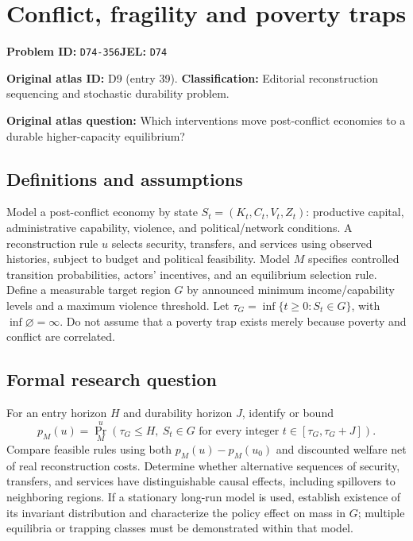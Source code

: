 \documentclass[11pt,a4paper]{article}
\begin{document}
\section*{Conflict, fragility and poverty traps}
\textbf{Problem ID:} \texttt{D74-356}\quad \textbf{JEL:} \texttt{D74}\par
\label{problem:OP-0039}
\label{atlas:prob:D9}
\noindent\textbf{Original atlas ID:} D9 (entry 39). \textbf{Classification:} Editorial reconstruction sequencing and stochastic durability problem.

\noindent\textbf{Original atlas question:} Which interventions move post-conflict economies to a durable higher-capacity equilibrium?

\subsection*{Definitions and assumptions}
Model a post-conflict economy by state $S_t=(K_t,C_t,V_t,Z_t)$: productive capital, administrative capability, violence, and political/network conditions. A reconstruction rule $u$ selects security, transfers, and services using observed histories, subject to budget and political feasibility. Model $M$ specifies controlled transition probabilities, actors' incentives, and an equilibrium selection rule. Define a measurable target region $G$ by announced minimum income/capability levels and a maximum violence threshold. Let $\tau_G=\inf\{t\geq0:S_t\in G\}$, with $\inf\varnothing=\infty$. Do not assume that a poverty trap exists merely because poverty and conflict are correlated.
\subsection*{Formal research question}
For an entry horizon $H$ and durability horizon $J$, identify or bound
\[
 p_M(u)=\Pr_M^u\!\left(\tau_G\leq H,
          \ S_t\in G\text{ for every integer }t\in[\tau_G,\tau_G+J]\right).
\]
Compare feasible rules using both $p_M(u)-p_M(u_0)$ and discounted welfare net of real reconstruction costs. Determine whether alternative sequences of security, transfers, and services have distinguishable causal effects, including spillovers to neighboring regions. If a stationary long-run model is used, establish existence of its invariant distribution and characterize the policy effect on mass in $G$; multiple equilibria or trapping classes must be demonstrated within that model.
\end{document}
